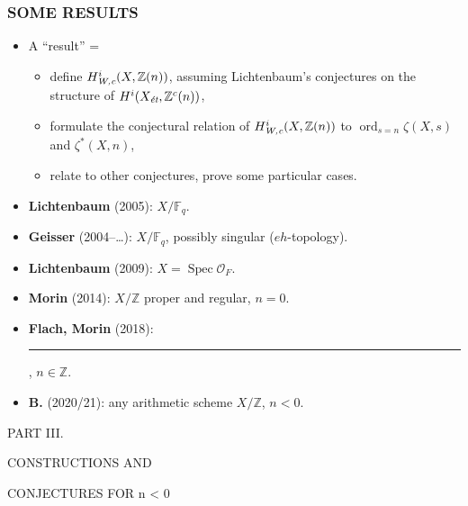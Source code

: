\documentclass[handout]{beamer}
\newcommand{\FF}{\mathbb{F}}
\newcommand{\ZZ}{\mathbb{Z}}
\DeclareMathOperator{\ord}{ord}
\DeclareMathOperator{\Spec}{Spec}
\newcommand{\et}{\text{\it ét}}
\newcommand{\Wc}{\text{\it W,c}}
\begin{document}

\begin{frame}
  \frametitle{SOME RESULTS}

  \begin{itemize}
  \item<2-> A ``result'' =
    \begin{itemize}
    \item<3-> define $H^i_\Wc (X, \ZZ(n))$, assuming Lichtenbaum's conjectures
      on the structure of $H^i (X_\et, \ZZ^c(n))$,
    \item<4-> formulate the conjectural relation of $H^i_\Wc (X, \ZZ(n))$ to
      $\ord_{s=n} \zeta (X,s)$ and $\zeta^* (X,n)$,
    \item<5-> relate to other conjectures, prove some particular cases.
    \end{itemize}

  \item<6-> \textbf{Lichtenbaum} (2005): $X/\FF_q$.

  \item<7-> \textbf{Geisser} (2004--\dots): $X/\FF_q$, possibly singular
    ($eh$-topology).

  \item<8-> \textbf{Lichtenbaum} (2009): $X = \Spec \mathcal{O}_F$.

  \item<9-> \textbf{Morin} (2014): $X/\ZZ$ proper and regular, $n = 0$.

  \item<10-> \textbf{Flach, Morin} (2018): \rule[0.25em]{2.75cm}{0.6pt},
    $n \in \ZZ$.

  \item<11-> \textbf{B.} (2020/21): any arithmetic scheme $X/\ZZ$, $n < 0$.
  \end{itemize}
\end{frame}


\begin{frame}[plain]
  \headingfont

  \begin{center}
    {\huge PART III.

      \vspace{1em}

      CONSTRUCTIONS AND

      \vspace{0.25em}

      CONJECTURES FOR n < 0}

  \end{center}
\end{frame}
\end{document}
